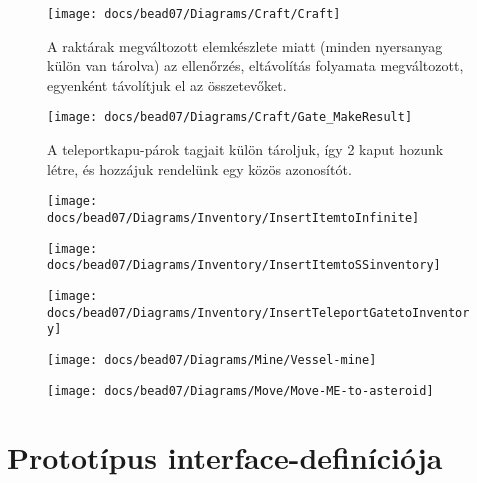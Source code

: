 \documentclass[../../projlab]{subfiles}
\begin{document}
\begin{figure}[H] 
    \centering 
    \texttt{[image: docs/bead07/Diagrams/Craft/Craft]} 
    \caption{A raktárak megváltozott elemkészlete miatt (minden nyersanyag külön van tárolva) az ellenőrzés, eltávolítás folyamata megváltozott, egyenként távolítjuk el az összetevőket. } 
\end{figure} 

\begin{figure}[H] 
    \centering 
    \texttt{[image: docs/bead07/Diagrams/Craft/Gate\_MakeResult]} 
    \caption{A teleportkapu-párok tagjait külön tároljuk, így 2 kaput hozunk létre, és hozzájuk rendelünk egy közös azonosítót.} 
\end{figure} 

\begin{figure}[H] 
    \centering 
    \texttt{[image: docs/bead07/Diagrams/Inventory/InsertItemtoInfinite]} 
    \caption{} 
\end{figure} 

\begin{figure}[H] 
    \centering 
    \texttt{[image: docs/bead07/Diagrams/Inventory/InsertItemtoSSinventory]} 
    \caption{} 
\end{figure} 

\begin{figure}[H] 
    \centering 
    \texttt{[image: docs/bead07/Diagrams/Inventory/InsertTeleportGatetoInventory]} 
    \caption{} 
\end{figure}

\begin{figure}[H] 
    \centering 
    \texttt{[image: docs/bead07/Diagrams/Mine/Vessel-mine]} 
    \caption{} 
\end{figure} 

\begin{figure}[H] 
    \centering 
    \texttt{[image: docs/bead07/Diagrams/Move/Move-ME-to-asteroid]} 
    \caption{} 
\end{figure} 


\section{Prototípus interface-definíciója}
\end{document}
